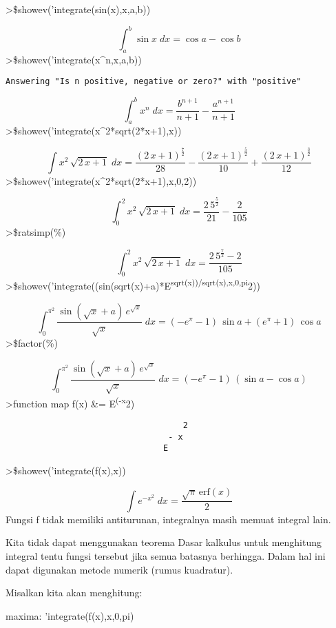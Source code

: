 \documentclass[
]{book}
\begin{document}
\textgreater\$showev('integrate(sin(x),x,a,b))

\[\int_{a}^{b}{\sin x\;dx}=\cos a-\cos b\]\textgreater\$showev('integrate(x\^{}n,x,a,b))

\begin{verbatim}
Answering "Is n positive, negative or zero?" with "positive"
\end{verbatim}

\[\int_{a}^{b}{x^{n}\;dx}=\frac{b^{n+1}}{n+1}-\frac{a^{n+1}}{n+1}\]\textgreater\$showev('integrate(x\^{}2*sqrt(2*x+1),x))

\[\int {x^2\,\sqrt{2\,x+1}}{\;dx}=\frac{\left(2\,x+1\right)^{\frac{7  }{2}}}{28}-\frac{\left(2\,x+1\right)^{\frac{5}{2}}}{10}+\frac{\left(  2\,x+1\right)^{\frac{3}{2}}}{12}\]\textgreater\$showev('integrate(x\^{}2*sqrt(2*x+1),x,0,2))

\[\int_{0}^{2}{x^2\,\sqrt{2\,x+1}\;dx}=\frac{2\,5^{\frac{5}{2}}}{21}-  \frac{2}{105}\]\textgreater\$ratsimp(\%)

\[\int_{0}^{2}{x^2\,\sqrt{2\,x+1}\;dx}=\frac{2\,5^{\frac{7}{2}}-2}{  105}\]\textgreater\$showev('integrate((sin(sqrt(x)+a)*E\textsuperscript{sqrt(x))/sqrt(x),x,0,pi}2))

\[\int_{0}^{\pi^2}{\frac{\sin \left(\sqrt{x}+a\right)\,e^{\sqrt{x}}}{  \sqrt{x}}\;dx}=\left(-e^{\pi}-1\right)\,\sin a+\left(e^{\pi}+1  \right)\,\cos a\]\textgreater\$factor(\%)

\[\int_{0}^{\pi^2}{\frac{\sin \left(\sqrt{x}+a\right)\,e^{\sqrt{x}}}{  \sqrt{x}}\;dx}=\left(-e^{\pi}-1\right)\,\left(\sin a-\cos a\right)\]\textgreater function map f(x) \&= E\textsuperscript{(-x}2)

\begin{verbatim}
                                    2
                                 - x
                                E
\end{verbatim}

\textgreater\$showev('integrate(f(x),x))

\[\int {e^ {- x^2 }}{\;dx}=\frac{\sqrt{\pi}\,\mathrm{erf}\left(x  \right)}{2}\]Fungsi f tidak memiliki antiturunan, integralnya masih memuat integral lain.

Kita tidak dapat menggunakan teorema Dasar kalkulus untuk menghitung integral tentu fungsi tersebut jika semua batasnya berhingga. Dalam hal ini dapat digunakan metode numerik (rumus kuadratur).

Misalkan kita akan menghitung:

maxima: 'integrate(f(x),x,0,pi)
\end{document}
